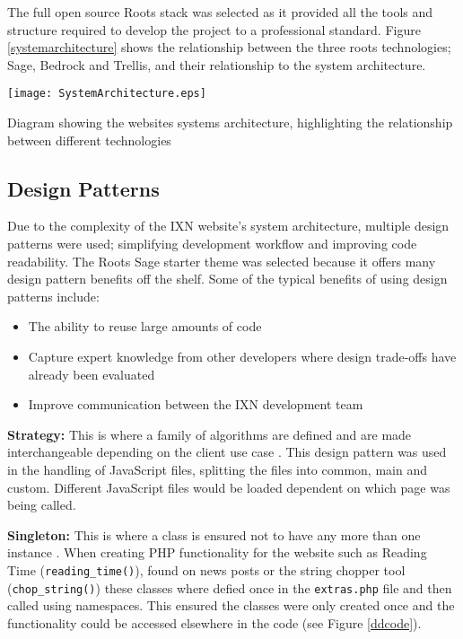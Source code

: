 \documentclass[fontsize=11pt]{extarticle}
\numberwithin{figure}{section} %
\providecommand{\tightlist}{%
  \setlength{\itemsep}{0pt}\setlength{\parskip}{0pt}}
\begin{document}
The full open source Roots stack \cite{rootsweb} was selected as it
provided all the tools and structure required to develop the project to
a professional standard. Figure \ref{systemarchitecture} shows the
relationship between the three roots technologies; Sage, Bedrock and
Trellis, and their relationship to the system architecture.

\begin{table}[H]
\centering
\texttt{[image: SystemArchitecture.eps]}
\caption{Diagram showing the websites systems architecture, highlighting the relationship between different technologies}
\label{systemarchitecture}
\end{table}

\hypertarget{design-patterns}{%
\subsection{Design Patterns}\label{design-patterns}}

Due to the complexity of the IXN website's system architecture, multiple
design patterns were used; simplifying development workflow and
improving code readability. The Roots Sage starter theme was selected
because it offers many design pattern benefits off the shelf. Some of
the typical benefits of using design patterns include:

\begin{itemize}
\tightlist
\item
  The ability to reuse large amounts of code \cite{deanDesignPatterns}
\item
  Capture expert knowledge from other developers where design trade-offs
  have already been evaluated
\item
  Improve communication between the IXN development team
\end{itemize}

\textbf{Strategy:} This is where a family of algorithms are defined and
are made interchangeable depending on the client use case
\cite{gamma1995design}. This design pattern was used in the handling of
JavaScript files, splitting the files into common, main and custom.
Different JavaScript files would be loaded dependent on which page was
being called.

\textbf{Singleton:} This is where a class is ensured not to have any
more than one instance \cite{gamma1995design}. When creating PHP
functionality for the website such as Reading Time
(\texttt{reading\_time()}), found on news posts or the string chopper
tool (\texttt{chop\_string()}) these classes where defied once in the
\texttt{extras.php} file and then called using namespaces. This ensured
the classes were only created once and the functionality could be
accessed elsewhere in the code (see Figure \ref{ddcode}).
\end{document}
